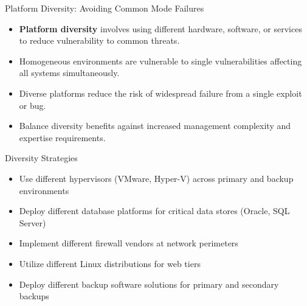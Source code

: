 \documentclass{beamer}
\begin{document}
\begin{frame}{Platform Diversity: Avoiding Common Mode Failures}
    \begin{itemize}
        \item \textbf{Platform diversity} involves using different hardware, software, or services to reduce vulnerability to common threats.
        \item Homogeneous environments are vulnerable to single vulnerabilities affecting all systems simultaneously.
        \item Diverse platforms reduce the risk of widespread failure from a single exploit or bug.
        \item Balance diversity benefits against increased management complexity and expertise requirements.
    \end{itemize}
    
    \begin{exampleblock}{Diversity Strategies}
        \scriptsize
        \begin{itemize}
            \item Use different hypervisors (VMware, Hyper-V) across primary and backup environments
            \item Deploy different database platforms for critical data stores (Oracle, SQL Server)
            \item Implement different firewall vendors at network perimeters
            \item Utilize different Linux distributions for web tiers
            \item Deploy different backup software solutions for primary and secondary backups
        \end{itemize}
    \end{exampleblock}
\end{frame}
\end{document}
